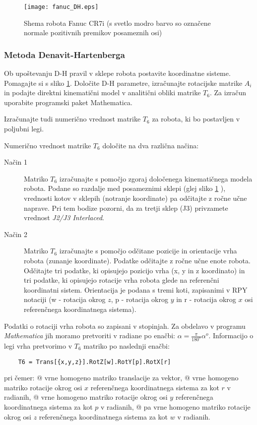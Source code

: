 \begin{figure}[h]
    \centering
    \texttt{[image: fanuc\_DH.eps]}
    \vspace{-0.3cm}
    \caption{Shema robota Fanuc CR7i (s svetlo modro barvo so označene normale pozitivnih premikov posameznih osi)}
    \label{fShemaCR7}
\end{figure}

\subsubsection{Metoda Denavit-Hartenberga}
Ob upoštevanju D-H pravil v sklepe robota postavite koordinatne sisteme.
Pomagajte si s sliko \ref{fShemaCR7}. Določite D-H parametre, izračunajte
rotacijske matrike $A_i$ in podajte direktni kinematični model v analitični
obliki matrike $T_6$. Za izračun uporabite programski paket Mathematica.

Izračunajte tudi numerično vrednost matrike $T_6$ za robota, ki bo postavljen v poljubni legi.

Numerično vrednost matrike $T_6$ določite na dva različna načina:
\begin{description}
  \item[Način 1] Matriko $T_6$ izračunajte s pomočjo zgoraj določenega kinematičnega modela robota.
  Podane so razdalje med posameznimi sklepi (glej sliko \ref{fShemaCR7} ), vrednosti kotov v sklepih (notranje koordinate)
  pa odčitajte z ročne učne naprave. Pri tem bodize pozorni, da za tretji sklep (J3) privzamete vrednost \emph{J2/J3 Interlaced}.
  \item[Način 2] Matriko $T_6$ izračunajte s pomočjo odčitane pozicije in orientacije vrha robota (zunanje koordinate).
  Podatke odčitajte z ročne učne enote robota. Odčitajte tri podatke, ki opisujejo pozicijo vrha (x, y in z koordinato)
    in tri podatke, ki opisujejo rotacije vrha robota glede na referenčni koordinatni sistem. Orientacija je podana s tremi koti, zapisanimi v RPY notaciji (w - rotacija okrog $z$, p - rotacija okrog $y$ in r - rotacija okrog $x$ osi referenčnega koordinatnega sistema).
\end{description}

Podatki o rotaciji vrha robota so zapisani v stopinjah. Za obdelavo v programu
\emph{Mathematica} jih moramo pretvoriti v radiane po enačbi: $\alpha =
\frac{\pi}{180^o} \alpha^o$. Informacijo o legi vrha pretvorimo v $T_6$
matriko po naslednji enačbi:
\begin{verbatim}
    T6 = Trans[{x,y,z}].RotZ[w].RotY[p].RotX[r]
\end{verbatim}
pri čemer: \newline \verb@Trans[{x,y,z}]@ vrne homogeno matriko
translacije za vektor, \newline \verb@RotX[r]@ vrne homogeno matriko
rotacije okrog osi $x$ referenčnega koordinatnega sistema za kot $r$ v radianih,
\newline \verb@RotY[p]@ vrne homogeno matriko rotacije okrog osi $y$
referenčnega koordinatnega sistema za kot $p$ v radianih,
\newline \verb@RotZ[w]@ pa vrne homogeno matriko rotacije okrog osi $z$
referenčnega koordinatnega sistema za kot $w$ v radianih.

